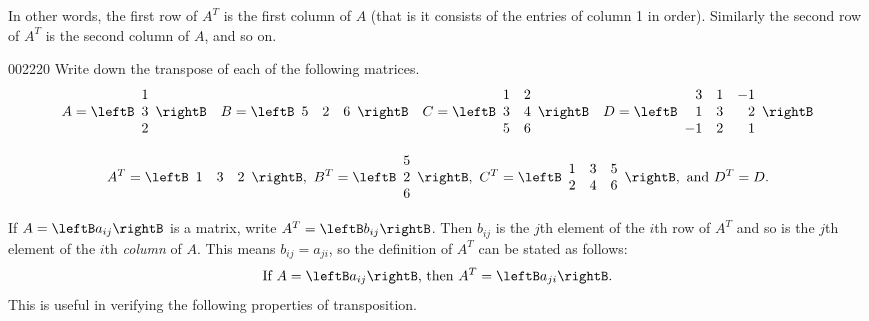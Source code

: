 \noindent In other words, the first row of $A^{T}$ is the first column of $A$ (that is it consists of the entries of column 1 in order). Similarly the second row of $A^{T}$ is the second column of $A$, and so on.


\begin{example}{}{002220}
Write down the transpose of each of the following matrices.
\begin{equation*}
A = \leftB \begin{array}{r}
1 \\
3 \\
2
\end{array} \rightB \quad
B = \leftB \begin{array}{rrr}
5 & 2 & 6
\end{array} \rightB \quad
C = \leftB \begin{array}{rr}
1 & 2 \\
3 & 4 \\
5 & 6
\end{array} \rightB \quad
D = \leftB \begin{array}{rrr}
3 & 1 & -1 \\
1 & 3 & 2 \\
-1 & 2 & 1
\end{array} \rightB
\end{equation*}
\begin{solution}
\begin{equation*}
A^{T} = \leftB \begin{array}{rrr}
1 & 3 & 2
\end{array} \rightB,\ B^{T} = \leftB \begin{array}{r}
5 \\
2 \\
6
\end{array} \rightB,\ C^{T} = \leftB \begin{array}{rrr}
1 & 3 & 5 \\
2 & 4 & 6
\end{array} \rightB, \mbox{ and } D^{T} = D.
\end{equation*}
\end{solution}
\end{example}

If $A = \leftB a_{ij} \rightB$ is a matrix, write $A^{T} = \leftB b_{ij} \rightB$. Then $b_{ij}$ is the $j$th element of the $i$th row of $A^{T}$ and so is the $j$th element of the $i$th \textit{column} of $A$. This means $b_{ij} = a_{ji}$, so the definition of $A^{T}$ can be stated as follows:
\begin{equation} \label{eq:transpose}
\mbox{If } A = \leftB a_{ij} \rightB \mbox{, then } A^{T} = \leftB a_{ji} \rightB.
\end{equation}
This is useful in verifying the following properties of transposition.


